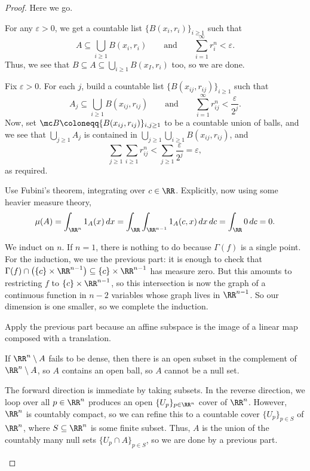 \documentclass[../notes.tex]{subfiles}
\begin{document}
\begin{proof}
	Here we go.
	\begin{listalph}
		\item For any $\varepsilon>0$, we get a countable list $\{B(x_i,r_i)\}_{i\ge1}$ such that
		\[A\subseteq\bigcup_{i\ge1}B(x_i,r_i)\qquad\text{and}\qquad\sum_{i=1}^\infty r_i^n<\varepsilon.\]
		Thus, we see that $B\subseteq A\subseteq\bigcup_{i\ge1}B(x_I,r_i)$ too, so we are done.
		\item Fix $\varepsilon>0$. For each $j$, build a countable list $\{B(x_{ij},r_{ij})\}_{i\ge1}$ such that
		\[A_j\subseteq\bigcup_{i\ge1}B(x_{ij},r_{ij})\qquad\text{and}\qquad\sum_{i=1}^\infty r_{ij}^n<\frac{\varepsilon}{2^j}.\]
		Now, set $\mc B\coloneqq\{B(x_{ij},r_{ij})\}_{i,j\ge1}$ to be a countable union of balls, and we see that $\bigcup_{j\ge1}A_j$ is contained in $\bigcup_{j\ge1}\bigcup_{i\ge1}B(x_{ij},r_{ij})$, and
		\[\sum_{j\ge1}\sum_{i\ge1}r_{ij}^n<\sum_{j\ge1}\frac\varepsilon{2^j}=\varepsilon,\]
		as required.
		\item Use Fubini's theorem, integrating over $c\in\RR$. Explicitly, now using some heavier measure theory,
		\[\mu(A)=\int_{\RR^n}1_A(x)\,dx=\int_\RR\int_{\RR^{n-1}}1_A(c,x)\,dx\,dc=\int_\RR0\,dc=0.\]
		\item We induct on $n$. If $n=1$, there is nothing to do because $\Gamma(f)$ is a single point. For the induction, we use the previous part: it is enough to check that $\Gamma(f)\cap\left(\{c\}\times\RR^{n-1}\right)\subseteq\{c\}\times\RR^{n-1}$ has measure zero. But this amounts to restricting $f$ to $\{c\}\times\RR^{n-1}$, so this intersection is now the graph of a continuous function in $n-2$ variables whose graph lives in $\RR^{n-1}$. So our dimension is one smaller, so we complete the induction.
		\item Apply the previous part because an affine subspace is the image of a linear map composed with a translation.
		\item If $\RR^n\setminus A$ fails to be dense, then there is an open subset in the complement of $\RR^n\setminus A$, so $A$ contains an open ball, so $A$ cannot be a null set.
		\item The forward direction is immediate by taking subsets. In the reverse direction, we loop over all $p\in\RR^n$ produces an open $\{U_p\}_{p\in\RR^n}$ cover of $\RR^n$. However, $\RR^n$ is countably compact, so we can refine this to a countable cover $\{U_p\}_{p\in S}$ of $\RR^n$, where $S\subseteq\RR^n$ is some finite subset. Thus, $A$ is the union of the countably many null sets $\{U_p\cap A\}_{p\in S}$, so we are done by a previous part.

\end{listalph}
\end{proof}
\end{document}
